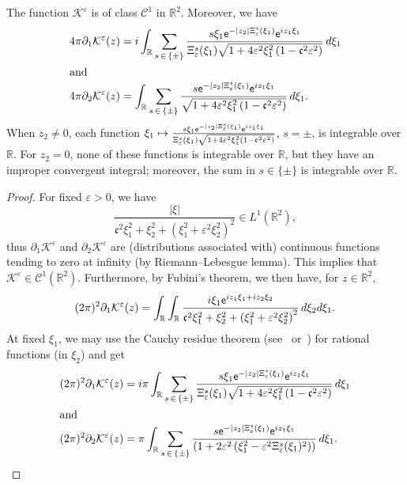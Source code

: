 \documentclass[10pt]{amsart}
\theoremstyle{definition}\newtheorem{defi}[theo]{Definition}\newtheorem{rema}[theo]{Remark}\newtheorem{exam}[theo]{Example}\newtheorem{exem}[theo]{Example}\newtheorem{nota}[theo]{Notation}
\newcommand*\p{\partial}
\newcommand*\R{\mathbb R}
\newcommand*\BC{\mathcal{C}}
\newcommand*\BK{\mathcal{K}}
\newcommand*\ex{{\sf e}}
\newcommand*\cs{{\mathfrak c}}
\newcommand*\e{\varepsilon}
\begin{document}
\begin{prop}\label{pepin_1}
The function $ \BK^\e $ is of class $ \BC^1 $ in $ \R^2 $. Moreover, we have
\begin{align*}
4 \pi \p_1 \BK^\e (z) &= i
\int_{\R} \sum_{s\,\in\,\{ \pm \} } \frac{ s \xi_1 \ex^{- |z_2| \Xi_\e^s (\xi_1)} \ex^{i z_1 \xi_1} }{\Xi_\e^s (\xi_1)
\sqrt{1 + 4\e^2 \xi_1^2 \left(1 - \cs^2 \e^2\right)}} \, d\xi_1
\\
\intertext{and}
4 \pi \p_2 \BK^\e (z) &=
\int_{\R} \sum_{s\,\in\,\{ \pm \} } \frac{ s \ex^{- |z_2| \Xi_\e^s (\xi_1)} \ex^{i z_1 \xi_1} }{ \sqrt{1 + 4\e^2 \xi_1^2 \left(1 - \cs^2 \e^2\right) } } \, d\xi_1.
\end{align*}
When $ z_2 \neq 0 $, each function $ \xi_1 \mapsto \frac{ s \xi_1 \ex^{- |z_2| \Xi_\e^s (\xi_1)} \ex^{i z_1 \xi_1} }{\Xi_\e^s (\xi_1)
\sqrt{1 + 4\e^2 \xi_1^2 (1 - \cs^2 \e^2) } } $, $ s = \pm $, is integrable over $ \R $. For $ z_2 = 0 $, none of these functions is integrable over $ \R $, but they have an improper convergent integral; moreover, the sum in $s \in \{ \pm \} $ is integrable over $\R $.
\end{prop}

\begin{proof}
For fixed $ \e> 0 $, we have
\[
\frac{ \lvert \xi \rvert}{ \cs^2 \xi_1^2 + \xi_2^2 + (\xi_1^2 + \e^2 \xi_2^2)^2 }
\in L^1 (\R^2),
\]
thus $ \p_1 \BK^\e $ and $ \p_2 \BK^\e $ are (distributions associated with) continuous functions tending to zero at infinity (by Riemann--Lebesgue lemma). This implies that $ \BK^\e \in \BC^1 (\R^2) $. Furthermore, by Fubini's theorem, we then have, for $z \in \R^2 $,
\[
(2\pi)^2 \p_1 \BK^\e (z) = \int_\R \int_\R \frac{ i \xi_1 \ex^{i z_1 \xi_1 + i z_2 \xi_2} }{ \cs^2 \xi_1^2 + \xi_2^2 + \left(\xi_1^2 + \e^2 \xi_2^2\right)^2 } \, d\xi_2 d\xi_1.
\]
At fixed $ \xi_1 $, we may use the Cauchy residue theorem (see~\cite[Chap.~VI, \S~2, Theorem~2.2 p.~194]{Lang} or~\cite[Chap. 9, Theorem~9.1 p.~154]{Howie}) for rational functions (in $ \xi_2 $) and get
\begin{align*}
(2\pi)^2 \p_1 \BK^\e (z) &= i \pi \int_{\R} \sum_{s\,\in\,\{ \pm \} } \frac{ s \xi_1 \ex^{- |z_2| \Xi_\e^s (\xi_1)} \ex^{i z_1 \xi_1} }{\Xi_\e^s (\xi_1) \sqrt{1 + 4\e^2 \xi_1^2\left(1 - \cs^2 \e^2\right) } } \, d\xi_1
\\
\intertext{and}
(2\pi)^2 \p_2 \BK^\e (z) &= \pi
\int_{\R} \sum_{s\,\in\,\{ \pm \} } \frac{ s \ex^{- |z_2| \Xi_\e^s (\xi_1)} \ex^{i z_1 \xi_1} }{\left(1 + 2\e^2 \left(\xi_1^2 - \e^2 \Xi_\e^s (\xi_1)^2\right)\right)} \, d\xi_1.\qedhere
\end{align*}
\end{proof}
\end{document}
